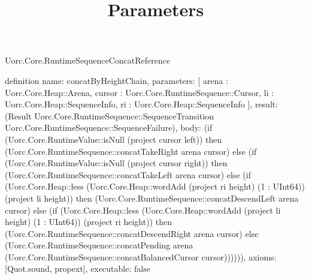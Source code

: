 \begin{lexlean}{Uorc.Core.RuntimeSequenceConcatReference}
\title{Parameters}
\begin{semanticmodule}
definition{
  name: concatByHeightChain,
  parameters: [
    arena : Uorc.Core.Heap::Arena,
    cursor : Uorc.Core.RuntimeSequence::Cursor,
    li : Uorc.Core.Heap::SequenceInfo,
    ri : Uorc.Core.Heap::SequenceInfo
  ],
  result: (Result Uorc.Core.RuntimeSequence::SequenceTransition Uorc.Core.RuntimeSequence::SequenceFailure),
  body: (if (Uorc.Core.RuntimeValue::isNull (project cursor left)) then (Uorc.Core.RuntimeSequence::concatTakeRight arena cursor) else (if (Uorc.Core.RuntimeValue::isNull (project cursor right)) then (Uorc.Core.RuntimeSequence::concatTakeLeft arena cursor) else (if (Uorc.Core.Heap::less (Uorc.Core.Heap::wordAdd (project ri height) (1 : UInt64)) (project li height)) then (Uorc.Core.RuntimeSequence::concatDescendLeft arena cursor) else (if (Uorc.Core.Heap::less (Uorc.Core.Heap::wordAdd (project li height) (1 : UInt64)) (project ri height)) then (Uorc.Core.RuntimeSequence::concatDescendRight arena cursor) else (Uorc.Core.RuntimeSequence::concatPending arena (Uorc.Core.RuntimeSequence::concatBalancedCursor cursor)))))),
  axioms: [Quot.sound, propext],
  executable: false
}


\end{semanticmodule}
\end{lexlean}
